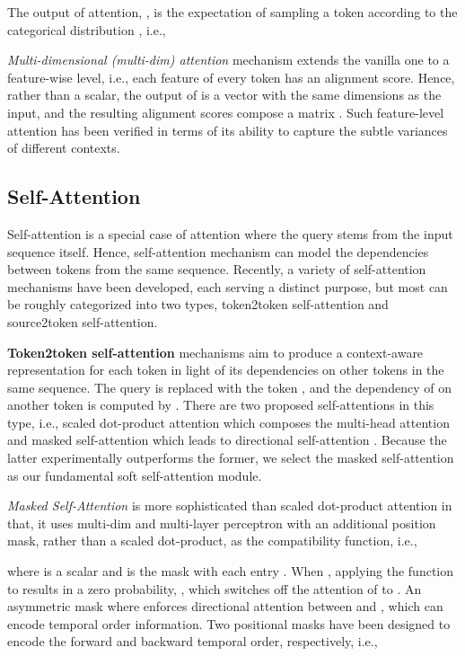 \documentclass{article}
\begin{document}
The output of attention, , is the expectation of sampling a token according to the categorical distribution , i.e.,


\textit{Multi-dimensional (multi-dim) attention} mechanism \cite{shen2017disan} extends the vanilla one \cite{bahdanau2015neural} to a feature-wise level, i.e., each feature of every token has an alignment score. Hence, rather than a scalar, the output of  is a vector with the same dimensions as the input, and the resulting alignment scores compose a matrix . Such feature-level attention has been verified in terms of its ability to capture the subtle variances of different contexts.

\subsection{Self-Attention} \label{sec:self_attn}

Self-attention is a special case of attention where the query  stems from the input sequence itself. Hence, self-attention mechanism can model the dependencies between tokens from the same sequence. Recently, a variety of self-attention mechanisms have been developed, each serving a distinct purpose, but most can be roughly categorized into two types, token2token self-attention and source2token self-attention. 

\textbf{Token2token self-attention} mechanisms aim to produce a context-aware representation for each token in light of its dependencies on other tokens in the same sequence. The query  is replaced with the token , and the dependency of  on another token  is computed by . There are two proposed self-attentions in this type, i.e., scaled dot-product attention which composes the multi-head attention \cite{vaswani2017attention} and masked self-attention which leads to directional self-attention \cite{shen2017disan}. Because the latter experimentally outperforms the former, we select the masked self-attention as our fundamental soft self-attention module.


\textit{Masked Self-Attention} is more sophisticated than scaled dot-product attention in that, it uses multi-dim and multi-layer perceptron with an additional position mask, rather than a scaled dot-product, as the compatibility function, i.e.,

where  is a scalar and  is the mask with each entry . When , applying the  function to  results in a zero probability, , which switches off the attention of  to . An asymmetric mask where  enforces directional attention between  and , which can encode temporal order information. Two positional masks have been designed to encode the forward and backward temporal order, respectively, i.e.,
\end{document}
